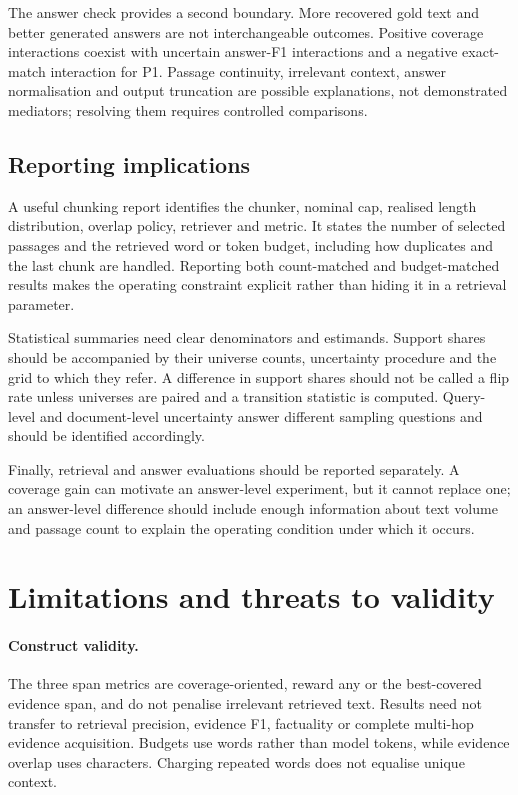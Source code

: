 \documentclass[11pt]{article}
\begin{document}
The answer check provides a second boundary. More recovered gold text and better generated answers are not
interchangeable outcomes. Positive coverage interactions coexist with uncertain answer-F1 interactions and a negative
exact-match interaction for P1. Passage continuity, irrelevant context, answer normalisation and output truncation are
possible explanations, not demonstrated mediators; resolving them requires controlled comparisons.

\subsection{Reporting implications}
A useful chunking report identifies the chunker, nominal cap, realised length distribution, overlap policy, retriever
and metric. It states the number of selected passages and the retrieved word or token budget, including how duplicates
and the last chunk are handled. Reporting both count-matched and budget-matched results makes the operating constraint
explicit rather than hiding it in a retrieval parameter.

Statistical summaries need clear denominators and estimands. Support shares should be accompanied by their universe
counts, uncertainty procedure and the grid to which they refer. A difference in support shares should not be called a
flip rate unless universes are paired and a transition statistic is computed. Query-level and document-level
uncertainty answer different sampling questions and should be identified accordingly.

Finally, retrieval and answer evaluations should be reported separately. A coverage gain can motivate an answer-level
experiment, but it cannot replace one; an answer-level difference should include enough information about text volume
and passage count to explain the operating condition under which it occurs.

\section{Limitations and threats to validity}\label{sec:limitations}
\paragraph{Construct validity.}
The three span metrics are coverage-oriented, reward any or the best-covered evidence span, and do not penalise
irrelevant retrieved text. Results need not transfer to retrieval precision, evidence F1, factuality or complete
multi-hop evidence acquisition. Budgets use words rather than model tokens, while evidence overlap uses characters.
Charging repeated words does not equalise unique context.
\end{document}
